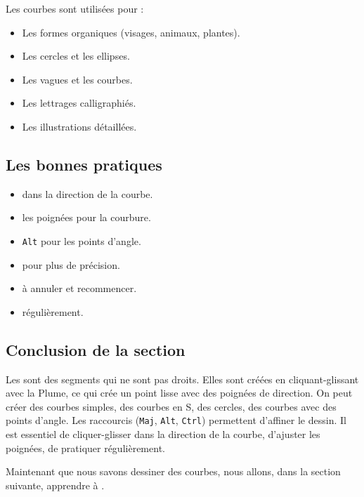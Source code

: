 Les courbes sont utilisées pour :

\begin{itemize}
    \item Les formes organiques (visages, animaux, plantes).
    \item Les cercles et les ellipses.
    \item Les vagues et les courbes.
    \item Les lettrages calligraphiés.
    \item Les illustrations détaillées.
\end{itemize}

\subsection{Les bonnes pratiques}

\begin{itemize}
    \item {} dans la direction de la courbe.
    \item {} les poignées pour la courbure.
    \item {} \texttt{Alt} pour les points d'angle.
    \item {} pour plus de précision.
    \item {} à annuler et recommencer.
    \item {} régulièrement.
\end{itemize}

\subsection*{Conclusion de la section}

Les  sont des segments qui ne sont pas droits. Elles sont créées en cliquant-glissant avec la Plume, ce qui crée un point lisse avec des poignées de direction. On peut créer des courbes simples, des courbes en S, des cercles, des courbes avec des points d'angle. Les raccourcis (\texttt{Maj}, \texttt{Alt}, \texttt{Ctrl}) permettent d'affiner le dessin. Il est essentiel de cliquer-glisser dans la direction de la courbe, d'ajuster les poignées, de pratiquer régulièrement.

Maintenant que nous savons dessiner des courbes, nous allons, dans la section suivante, apprendre à .

